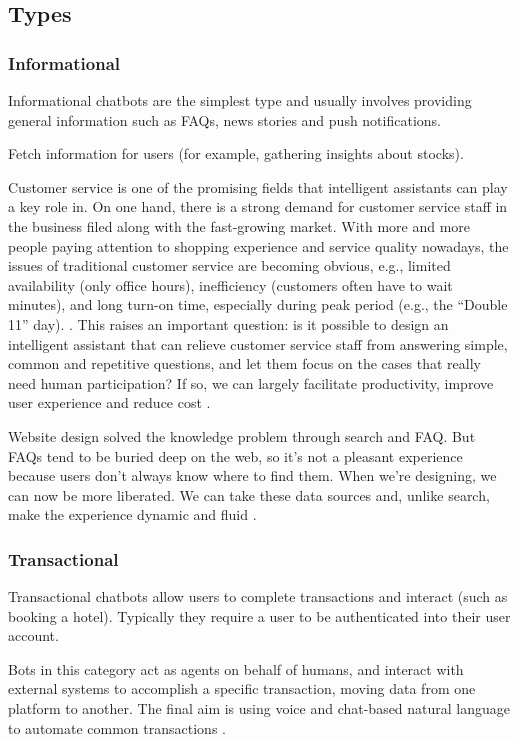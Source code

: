 \subsection{Types}

\subsubsection{Informational}
Informational chatbots are the simplest type and usually involves providing general information such as FAQs, news stories and push notifications.

Fetch information for users (for example, gathering insights about stocks).

Customer service is one of the promising fields that intelligent assistants can play a key role in. On one hand, there is a strong demand for customer service staff in the business filed along with the fast-growing market. With more and more people paying attention to shopping experience and service quality nowadays, the issues of traditional customer service are becoming obvious, e.g., limited availability (only office hours), inefficiency (customers often have to wait minutes), and long turn-on time, especially during peak period (e.g., the “Double 11” day). \cite{li2017}. This raises an important question: is it possible to design an intelligent assistant that can relieve customer service staff from answering simple, common and repetitive questions, and let them focus on the cases that really need human participation? If so, we can largely facilitate productivity, improve user experience and reduce cost \cite{li2017}.

Website design solved the knowledge problem through search and FAQ. But FAQs tend to be buried deep on the web, so it's not a pleasant experience because users don’t always know where to find them. When we’re designing, we can now be more liberated. We can take these data sources and, unlike search, make the experience dynamic and fluid \cite{etlinger2017}.

\subsubsection{Transactional}
Transactional chatbots allow users to complete transactions and interact (such as booking a hotel). Typically they require a user to be authenticated into their user account.

Bots in this category act as agents on behalf of humans, and interact with external systems to accomplish a specific transaction, moving data from one platform to another.
The final aim is using voice and chat-based natural language to automate common transactions \cite{etlinger2017}.

